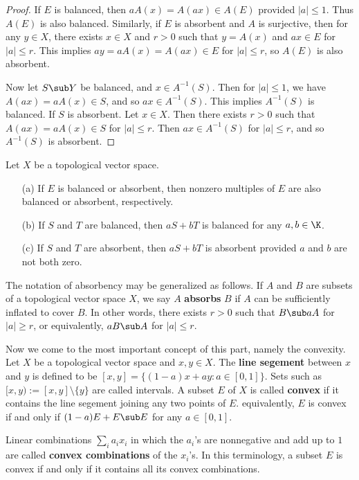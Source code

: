 \begin{proof}
If $E$ is balanced, then $aA(x)=A(ax)\in A(E)$ provided $|a|\leq 1$. Thus $A(E)$ is also balanced. Similarly, if $E$ is absorbent and $A$ is surjective, then for any $y\in X$, there exists $x\in X$ and $r>0$ such that $y=A(x)$ and $ax\in E$ for $|a|\leq r$. This implies $ay=aA(x)=A(ax)\in E$ for $|a|\leq r$, so $A(E)$ is also absorbent.\par
Now let $S\sub Y$ be balanced, and $x\in A^{-1}(S)$. Then for $|a|\leq 1$, we have $A(ax)=aA(x)\in S$, and so $ax\in A^{-1}(S)$. This implies $A^{-1}(S)$ is balanced. If $S$ is absorbent. Let $x\in X$. Then there exists $r>0$ such that $A(ax)=aA(x)\in S$ for $|a|\leq r$. Then $ax\in A^{-1}(S)$ for $|a|\leq r$, and so $A^{-1}(S)$ is absorbent.
\end{proof}
\begin{corollary}\label{TVS balanced and absorbent linear combination}
Let $X$ be a topological vector space.
\begin{itemize}
\item[(a)] If $E$ is balanced or absorbent, then nonzero multiples of $E$ are also balanced or absorbent, respectively.
\item[(b)] If $S$ and $T$ are balanced, then $aS+bT$ is balanced for any $a,b\in\K$.
\item[(c)] If $S$ and $T$ are absorbent, then $aS+bT$ is absorbent provided $a$ and $b$ are not both zero.
\end{itemize}
\end{corollary}
The notation of absorbency may be generalized as follows. If $A$ and $B$ are subsets of a topological vector space $X$, we say $A$ \textbf{absorbs} $B$ if $A$ can be sufficiently inflated to cover $B$. In other words, there exists $r>0$ such that $B\sub aA$ for $|a|\geq r$, or equivalently, $aB\sub A$ for $|a|\leq r$.\par
Now we come to the most important concept of this part, namely the convexity. Let $X$ be a topological vector space and $x,y\in X$. The \textbf{line segement} between $x$ and $y$ is defined to be $[x,y]=\{(1-a)x+ay:a\in[0,1]\}$. Sets such as $[x,y):=[x,y]\setminus\{y\}$ are called intervals. A subset $E$ of $X$ is called \textbf{convex} if it contains the line segement joining any two points of $E$. equivalently, $E$ is convex if and only if $(1-a)E+E\sub E$ for any $a\in[0,1]$.\par
Linear combinations $\sum_ia_ix_i$ in which the $a_i$'s are nonnegative and add up to $1$ are called \textbf{convex combinations} of the $x_i$'s. In this terminology, a subset $E$ is convex if and only if it contains all its convex combinations.\par
